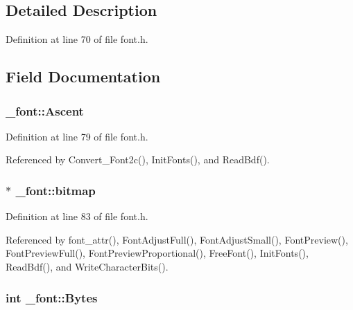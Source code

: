 \subsection{Detailed Description}


Definition at line 70 of file font.\-h.



\subsection{Field Documentation}
\hypertarget{struct__font_a998e54724f56879aa85c5ec169873f39}{
\subsubsection[{Ascent}]{ \-\_\-font\-::\-Ascent}}\label{struct__font_a998e54724f56879aa85c5ec169873f39}


Definition at line 79 of file font.\-h.



Referenced by Convert\-\_\-\-Font2c(), Init\-Fonts(), and Read\-Bdf().

\hypertarget{struct__font_a336f543c3fe3d3197c6e709fa7df0f5b}{
\subsubsection[{bitmap}]{ $\ast$ \-\_\-font\-::bitmap}}\label{struct__font_a336f543c3fe3d3197c6e709fa7df0f5b}


Definition at line 83 of file font.\-h.



Referenced by font\-\_\-attr(), Font\-Adjust\-Full(), Font\-Adjust\-Small(), Font\-Preview(), Font\-Preview\-Full(), Font\-Preview\-Proportional(), Free\-Font(), Init\-Fonts(), Read\-Bdf(), and Write\-Character\-Bits().

\hypertarget{struct__font_a13b0b0e4e91f4d663ba4c3c11bfbda8a}{
\subsubsection[{Bytes}]{\setlength{\rightskip}{0pt plus 5cm}int \-\_\-font\-::\-Bytes}}\label{struct__font_a13b0b0e4e91f4d663ba4c3c11bfbda8a}


